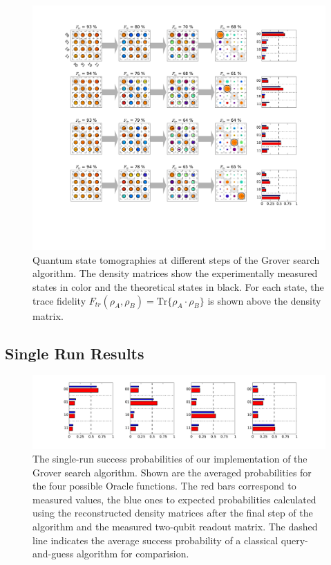 \begin{figure}[ht!]
	\centering
		\includegraphics[width=1.\textwidth]{"./data/ct5/2011_04_21 - grover and tomo/good_data/grover algorithm - single run results - density matrices only"}
	\caption[Quantum state tomographies at different steps during the Grover search algorithm and single-run outcome probabilities]{Quantum state tomographies at different steps of the Grover search algorithm. The density matrices show the experimentally measured states in color and the theoretical states in black. For each state, the trace fidelity $F_{tr}(\rho_A,\rho_B) = \mathrm{Tr}\{\rho_A\cdot\rho_B\}$ is shown above the density matrix.}
	\label{fig:GroverAlgorithmExperimentalResults}
\end{figure}

\subsection{Single Run Results}

\begin{figure}[htb!]
	\centering
		\includegraphics[width=1.\textwidth]{"./data/ct5/2011_04_21 - grover and tomo/good_data/grover algorithm - single run probabilities"}
		\caption[Single-run success probabilities of the Grover search algorithm]{The single-run success probabilities of our implementation of the Grover search algorithm. Shown are the averaged probabilities for the four possible Oracle functions. The red bars correspond to measured values, the blue ones to expected probabilities calculated using the reconstructed density matrices after the final step of the algorithm and the measured two-qubit readout matrix. The dashed line indicates the average success probability of a classical query-and-guess algorithm for comparision.}
	\label{fig:GroverSingleShotResults}
\end{figure}

